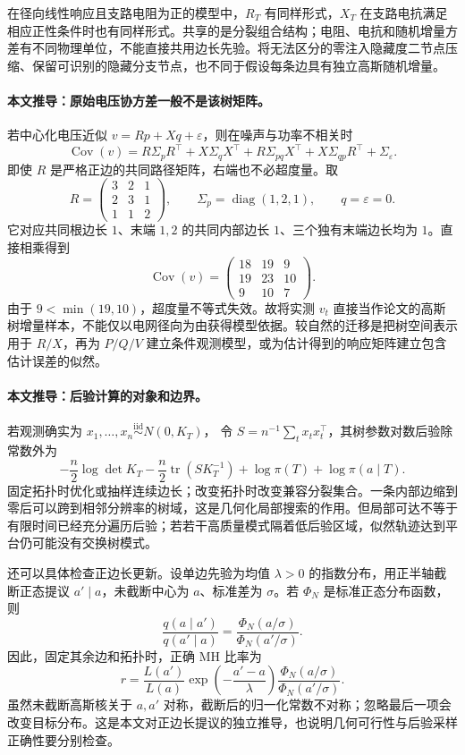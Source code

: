 在径向线性响应且支路电阻为正的模型中，$R_T$ 有同样形式，$X_T$ 在支路电抗满足相应正性条件时也有同样形式。共享的是分裂组合结构；电阻、电抗和随机增量方差有不同物理单位，不能直接共用边长先验。将无法区分的零注入隐藏度二节点压缩、保留可识别的隐藏分支节点，也不同于假设每条边具有独立高斯随机增量。

\paragraph{本文推导：原始电压协方差一般不是该树矩阵。}
若中心化电压近似 $v=Rp+Xq+\varepsilon$，则在噪声与功率不相关时
\[
 \operatorname{Cov}(v)
 =R\Sigma_pR^\top+X\Sigma_qX^\top
  +R\Sigma_{pq}X^\top+X\Sigma_{qp}R^\top+\Sigma_\varepsilon.
\]
即使 $R$ 是严格正边的共同路径矩阵，右端也不必超度量。取
\[
 R=\begin{pmatrix}3&2&1\\2&3&1\\1&1&2\end{pmatrix},
 \qquad
 \Sigma_p=\operatorname{diag}(1,2,1),\qquad q=\varepsilon=0.
\]
它对应共同根边长 $1$、末端 $1,2$ 的共同内部边长 $1$、三个独有末端边长均为 $1$。直接相乘得到
\[
 \operatorname{Cov}(v)
 =\begin{pmatrix}18&19&9\\19&23&10\\9&10&7\end{pmatrix}.
\]
由于 $9<\min(19,10)$，超度量不等式失效。故将实测 $v_t$ 直接当作论文的高斯树增量样本，不能仅以电网径向为由获得模型依据。较自然的迁移是把树空间表示用于 $R/X$，再为 $P/Q/V$ 建立条件观测模型，或为估计得到的响应矩阵建立包含估计误差的似然。

\paragraph{本文推导：后验计算的对象和边界。}
若观测确实为 $x_1,\ldots,x_n\stackrel{\mathrm{iid}}{\sim}N(0,K_T)$，
令 $S=n^{-1}\sum_tx_tx_t^\top$，其树参数对数后验除常数外为
\[
 -\frac n2\log\det K_T
 -\frac n2\operatorname{tr}(SK_T^{-1})
 +\log\pi(T)+\log\pi(a\mid T).
\]
固定拓扑时优化或抽样连续边长；改变拓扑时改变兼容分裂集合。一条内部边缩到零后可以跨到相邻分辨率的树域，这是几何化局部搜索的作用。但局部可达不等于有限时间已经充分遍历后验；若若干高质量模式隔着低后验区域，似然轨迹达到平台仍可能没有交换树模式。

还可以具体检查正边长更新。设单边先验为均值 $\lambda>0$ 的指数分布，用正半轴截断正态提议 $a'\mid a$，未截断中心为 $a$、标准差为 $\sigma$。若 $\Phi_N$ 是标准正态分布函数，则
\[
 \frac{q(a\mid a')}{q(a'\mid a)}
 =\frac{\Phi_N(a/\sigma)}{\Phi_N(a'/\sigma)}.
\]
因此，固定其余边和拓扑时，正确 MH 比率为
\[
 r=\frac{L(a')}{L(a)}
       \exp\!\left(-\frac{a'-a}{\lambda}\right)
       \frac{\Phi_N(a/\sigma)}{\Phi_N(a'/\sigma)}.
\]
虽然未截断高斯核关于 $a,a'$ 对称，截断后的归一化常数不对称；忽略最后一项会改变目标分布。这是本文对正边长提议的独立推导，也说明几何可行性与后验采样正确性要分别检查。

